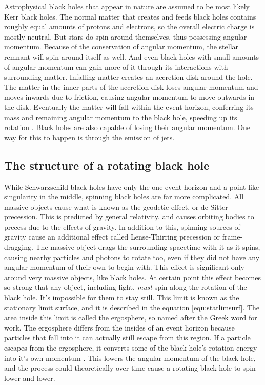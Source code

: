 \documentclass[english, oneside]{HYgradu}
\begin{document}
Astrophysical black holes that appear in nature are assumed to be most likely Kerr black holes. The normal matter that creates and feeds black holes contains roughly equal amounts of protons and electrons, so the overall electric charge is mostly neutral. But stars do spin around themselves, thus possessing angular momentum. Because of the conservation of angular momentum, the stellar remnant will spin around itself as well. And even black holes with small amounts of angular momentum can gain more of it through its interactions with surrounding matter. Infalling matter creates an accretion disk around the hole. The matter in the inner parts of the accretion disk loses angular momentum and moves inwards due to friction, causing angular momentum to move outwards in the disk. Eventually the matter will fall within the event horizon, conferring its mass and remaining angular momentum to the black hole, speeding up its rotation \citep{bhphysics}. Black holes are also capable of losing their angular momentum. One way for this to happen is through the emission of jets.

\subsection{The structure of a rotating black hole}

While Schwarzschild black holes have only the one event horizon and a point-like singularity in the middle, spinning black holes are far more complicated. All massive objects cause what is known as the geodetic effect, or de Sitter precession. This is predicted by general relativity, and causes orbiting bodies to precess due to the effects of gravity. In addition to this, spinning sources of gravity cause an additional effect called Lense-Thirring precession or frame-dragging. The massive object drags the surrounding spacetime with it as it spins, causing nearby particles and photons to rotate too, even if they did not have any angular momentum of their own to begin with. This effect is significant only around very massive objects, like black holes. At certain point this effect becomes so strong that any object, including light, \textit{must} spin along the rotation of the black hole. It's impossible for them to stay still. This limit is known as the stationary limit surface, and it is described in the equation \ref{equ:statlimsurf}. The area inside this limit is called the ergosphere, so named after the Greek word for work. The ergosphere differs from the insides of an event horizon because particles that fall into it can actually still escape from this region. If a particle escapes from the ergosphere, it converts some of the black hole's rotation energy into it's own momentum \citep{grintro}. This lowers the angular momentum of the black hole, and the process could theoretically over time cause a rotating black hole to spin lower and lower.
\end{document}
